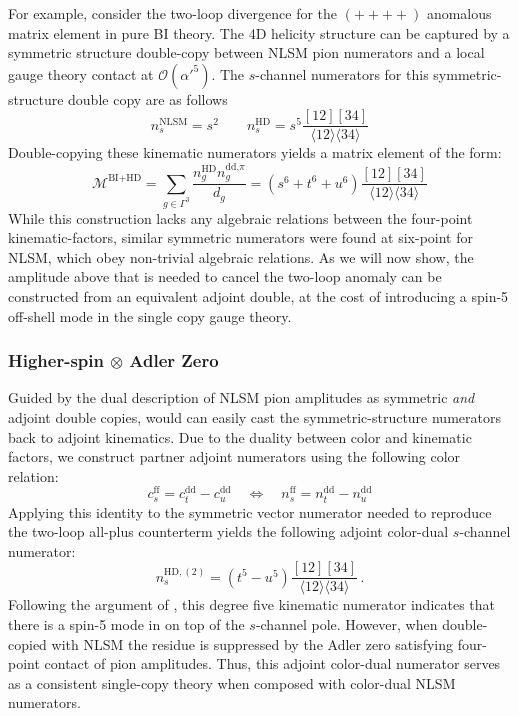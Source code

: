 \documentclass[12pt,letter]{article}
\def\be{\begin{equation}}
\def\ee{\end{equation}}
\begin{document}
For example, consider the two-loop divergence for the $(++++)$ anomalous matrix element in pure BI theory. The 4D helicity structure can be captured by a symmetric structure double-copy between NLSM pion numerators and a local gauge theory contact at $\mathcal{O}(\alpha'^5)$. The $s$-channel numerators for this symmetric-structure double copy are as follows
\be
n_s^{\text{NLSM}} = s^2 \qquad n_s^{\text{HD}} = s^5 \frac{[12][34]}{\langle 12\rangle \langle 34\rangle}
\ee
Double-copying these kinematic numerators yields a matrix element of the form:
\be
\mathcal{M}^{\text{BI}+\text{HD}} = \sum_{g\in \Gamma^3} \frac{n_g^{\text{HD}}n^{\text{dd,}\pi}_g}{d_g} = (s^6+t^6+u^6) \frac{[12][34]}{\langle 12\rangle \langle 34\rangle}
\ee
While this construction lacks any algebraic relations between the four-point kinematic-factors, similar symmetric numerators were found at six-point for NLSM, which obey non-trivial algebraic relations. As we will now show, the amplitude above that is needed to cancel the two-loop anomaly can be constructed from an equivalent adjoint double, at the cost of introducing a spin-5 off-shell mode in the single copy gauge theory. 
\subsubsection{Higher-spin $\otimes$ Adler Zero}\label{sec:HspinDC}
Guided by the dual description of NLSM pion amplitudes as symmetric \textit{and} adjoint double copies, would can easily cast the symmetric-structure numerators back to adjoint kinematics. Due to the duality between color and kinematic factors, we construct partner adjoint numerators using the following color relation:
\be
c_s^{\text{ff}} = c_t^{\text{dd}}-c_u^{\text{dd}} \quad \Leftrightarrow \quad n_s^{\text{ff}} = n_t^{\text{dd}}-n_u^{\text{dd}} 
\ee
Applying this identity to the symmetric vector numerator needed to reproduce the two-loop all-plus counterterm yields the following adjoint color-dual $s$-channel numerator:
\be\label{eq:2loopNumerator}
n^{\text{HD},(2)}_s = (t^{5}-u^{5})\frac{[12][34]}{\langle 12\rangle \langle 34\rangle}\,.
\ee
Following the argument of \cite{Pavao:2022kog}, this degree five kinematic numerator indicates that there is a spin-5 mode in on top of the $s$-channel pole. However, when double-copied with NLSM the residue is suppressed by the Adler zero satisfying four-point contact of pion amplitudes. Thus, this adjoint color-dual numerator serves as a consistent single-copy theory when composed with color-dual NLSM numerators. 
\end{document}
